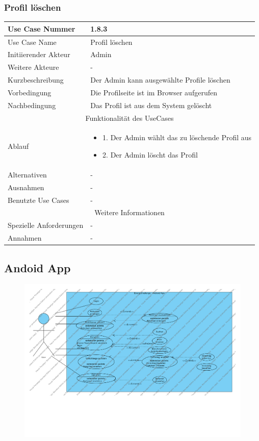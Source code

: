 \documentclass[10pt,a4paper]{article}
\begin{document}
			\subsubsection{Profil l\"oschen}
		\begin{tabular}{|l|p{.5\linewidth}|}
		\hline Use Case Nummer & 1.8.3 \\ 
		\hline Use Case Name & Profil l\"oschen \\ 
		\hline Initiierender Akteur & Admin \\
		\hline Weitere Akteure & - \\
		\hline Kurzbeschreibung & Der Admin kann ausgew\"ahlte Profile l\"oschen \\
		\hline Vorbedingung & Die Profilseite ist im Browser aufgerufen \\
		\hline Nachbedingung & Das Profil ist aus dem System gel\"oscht \\
		\hline \multicolumn{2}{|c|}{Funktionalität des UseCases}\\
		\hline  Ablauf & \begin{itemize}
					\item 1. Der Admin w\"ahlt das zu löschende Profil aus
					\item 2. Der Admin l\"oscht das Profil
				\end{itemize}\\
		\hline Alternativen & - \\
		\hline Ausnahmen & - \\
		\hline Benutzte Use Cases & - \\
		\hline \multicolumn{2}{|c|}{Weitere Informationen} \\
		\hline Spezielle Anforderungen & - \\
		\hline Annahmen & - \\
		\hline
		\end{tabular}
\subsection{Andoid App}
\begin{figure}[h!]
		\includegraphics[width=\linewidth]{gfx/androidapp/overview.pdf}
	\end{figure}
\end{document}
